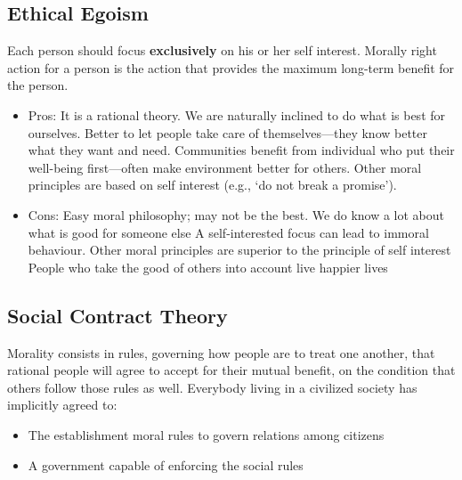 \documentclass{article}
\begin{document}
\pagebreak

\subsection{Ethical Egoism}
\begin{flushleft}
Each person should focus \textbf{exclusively} on his or her self interest. Morally right action for a person is the action that provides the maximum long-term benefit for the person.
\end{flushleft}
\begin{itemize}
  \item Pros: It is a rational theory. We are naturally inclined to do what is best for ourselves. Better to let people take care of themselves—they know better what they want and need. Communities benefit from individual who put their well-being first—often make environment better for others. Other moral principles are based on self interest (e.g., ‘do not break a promise’).
  \item Cons: Easy moral philosophy; may not be the best. We do know a lot about what is good for someone else A self-interested focus can lead to immoral behaviour. Other moral principles are superior to the principle of self interest People who take the good of others into account live happier lives
\end{itemize}

\subsection{Social Contract Theory}
\begin{flushleft}
Morality consists in rules, governing how people are to treat one another, that rational people will agree to accept for their mutual benefit, on the condition that others follow those rules as well. Everybody living in a civilized society has implicitly agreed to:
\begin{itemize}
  \item The establishment moral rules to govern relations among citizens 
  \item A government capable of enforcing the social rules
\end{itemize}
\end{flushleft}
\end{document}
